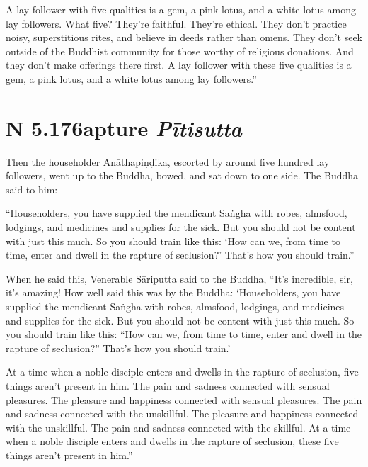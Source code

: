 \documentclass[12pt,openany]{book}%
\newcommand*{\suttatitleacronym}[1]{\smaller[2]{#1}\vspace*{.3em}}
\newcommand*{\suttatitletranslation}[1]{\linebreak{#1}}
\newcommand*{\suttatitleroot}[1]{\linebreak\smaller[2]\itshape{#1}}
\newcommand*{\tocacronym}[1]{\hspace*{-3.3em}{#1}\quad}
\newcommand*{\toctranslation}[1]{#1}
\newcommand*{\tocroot}[1]{(\textit{#1})}
\begin{document}
A lay follower with five qualities is a gem, a pink lotus, and a white lotus among lay followers. What five? They’re faithful. They’re ethical. They don’t practice noisy, superstitious rites, and believe in deeds rather than omens. They don’t seek outside of the Buddhist community for those worthy of religious donations. And they don’t make offerings there first. A lay follower with these five qualities is a gem, a pink lotus, and a white lotus among lay followers.” 

%
\section*{{\suttatitleacronym AN 5.176}{\suttatitletranslation Rapture }{\suttatitleroot Pītisutta}}
\addcontentsline{toc}{section}{\tocacronym{AN 5.176} \toctranslation{Rapture } \tocroot{Pītisutta}}

Then the householder \textsanskrit{Anāthapiṇḍika}, escorted by around five hundred lay followers, went up to the Buddha, bowed, and sat down to one side. The Buddha said to him: 

“Householders, you have supplied the mendicant \textsanskrit{Saṅgha} with robes, almsfood, lodgings, and medicines and supplies for the sick. But you should not be content with just this much. So you should train like this: ‘How can we, from time to time, enter and dwell in the rapture of seclusion?’ That’s how you should train.” 

When he said this, Venerable \textsanskrit{Sāriputta} said to the Buddha, “It’s incredible, sir, it’s amazing! How well said this was by the Buddha: ‘Householders, you have supplied the mendicant \textsanskrit{Saṅgha} with robes, almsfood, lodgings, and medicines and supplies for the sick. But you should not be content with just this much. So you should train like this: “How can we, from time to time, enter and dwell in the rapture of seclusion?” That’s how you should train.’ 

At a time when a noble disciple enters and dwells in the rapture of seclusion, five things aren’t present in him. The pain and sadness connected with sensual pleasures. The pleasure and happiness connected with sensual pleasures. The pain and sadness connected with the unskillful. The pleasure and happiness connected with the unskillful. The pain and sadness connected with the skillful. At a time when a noble disciple enters and dwells in the rapture of seclusion, these five things aren’t present in him.” 
\end{document}
